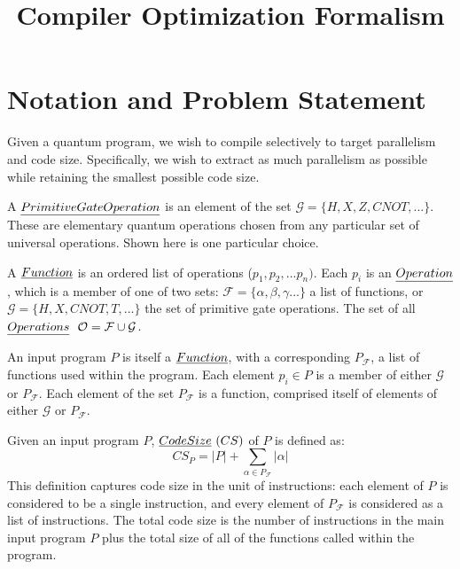 \documentclass[12pt,twoside]{article}
\begin{document}
\title{Compiler Optimization Formalism}


\maketitle

\section{Notation and Problem Statement}
Given a quantum program, we wish to compile selectively to target parallelism and code size. Specifically, we wish to extract as much parallelism as possible while retaining the smallest possible code size.  

\begin{definition} A $\emph{Primitive Gate Operation}$ is an element of the set $\mathcal{G} = \{H, X, Z, CNOT, ...\}$. These are elementary quantum operations chosen from any particular set of universal operations. Shown here is one particular choice.
\end{definition}

\begin{definition} A $\emph{Function}$ is an ordered list of operations ($p_1, p_2, ... p_n)$. Each $p_i$ is an $\emph{Operation}$, which is a member of one of two sets: $\mathcal{F} = \{\alpha, \beta, \gamma ... \}$ a list of functions, or $\mathcal{G} = \{H, X, CNOT, T, ... \}$ the set of primitive gate operations. The set of all $\emph{Operations}\ \  \mathcal{O} = \mathcal{F} \cup \mathcal{G}$. 
\end{definition}

\begin{definition} An input program $P$ is itself a $\emph{Function}$, with a corresponding $P_{\mathcal{F}}$, a list of functions used within the program. Each element $p_i \in P$ is a member of either $\mathcal{G}$ or $P_{\mathcal{F}}$. Each element of the set $P_{\mathcal{F}}$ is a function, comprised itself of elements of either $\mathcal{G}$ or $P_{\mathcal{F}}$. 
\end{definition}

\begin{definition} Given an input program $P$, $\emph{Code Size} \ (CS)$ of $P$ is defined as:
	\begin{equation}
		CS_P = |P| + \sum_{\alpha \in P_{\mathcal{F}}} |\alpha| 
	\end{equation}
	This definition captures code size in the unit of instructions: each element of $P$ is considered to be a single instruction, and every element of $P_{\mathcal{F}}$ is considered as a list of instructions. The total code size is the number of instructions in the main input program $P$ plus the total size of all of the functions called within the program.
\end{definition}
\end{document}
